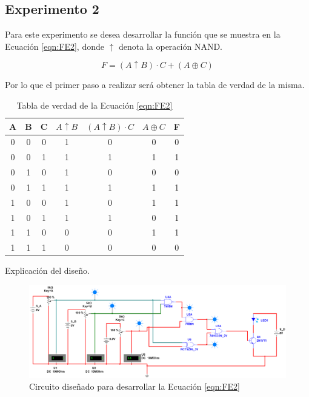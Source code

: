 \documentclass[journal]{IEEEtran}
\begin{document}
	\subsection{Experimento 2}
	
	Para este experimento se desea desarrollar la función que se muestra en la Ecuación \ref{eqn:FE2}, donde $\uparrow$ denota la operación NAND.
	
	\begin{equation}
		F = (A \uparrow B) \cdot C + (A \oplus C)
		\label{eqn:FE2}
	\end{equation}
	
	Por lo que el primer paso a realizar será obtener la tabla de verdad de la misma.
	
	\begin{table}[!htb]
		\centering
		\begin{tabular}{|c|c|c|c|c|c||c|}
			\hline
			A & B & C & $A \uparrow B$ & $(A \uparrow B) \cdot C$ & $A \oplus C$ & F \\
			\hline
			\hline
			0 & 0 & 0 & 1              & 0                        & 0            & 0 \\
			\hline
			0 & 0 & 1 & 1              & 1                        & 1            & 1 \\
			\hline
			0 & 1 & 0 & 1              & 0                        & 0            & 0 \\
			\hline
			0 & 1 & 1 & 1              & 1                        & 1            & 1 \\
			\hline
			1 & 0 & 0 & 1              & 0                        & 1            & 1 \\
			\hline
			1 & 0 & 1 & 1              & 1                        & 0            & 1 \\
			\hline
			1 & 1 & 0 & 0              & 0                        & 1            & 1 \\
			\hline
			1 & 1 & 1 & 0              & 0                        & 0            & 0 \\
			\hline
		\end{tabular}
		\caption{Tabla de verdad de la Ecuación \ref{eqn:FE2}}
		\label{tab:TVE2}
	\end{table}
	
	Explicación del diseño.
	
	\begin{figure}[!htb]
		\centering
		\includegraphics[scale = 0.215]{img/FuncionIterfaz.png}
		\caption{Circuito diseñado para desarrollar la Ecuación \ref{eqn:FE2}}
		\label{fig:CFI}
	\end{figure}
	
\end{document}

